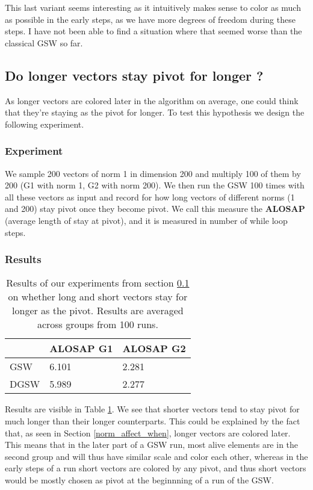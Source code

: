 \documentclass[12pt]{article}
\begin{document}
This last variant seems interesting as it intuitively makes sense to color as much as possible in the early steps, as we have more degrees of freedom during these steps. I have not been able to find a situation where that seemed worse than the classical GSW so far. 


\subsection{Do longer vectors stay pivot for longer ?}\label{longer_vec_pivot_longer}
As longer vectors are colored later in the algorithm on average, one could think that they're staying as the pivot for longer. To test this hypothesis we design the following experiment.
\subsubsection{Experiment}
We sample 200 vectors of norm 1 in dimension 200 and multiply 100 of them by 200 (G1 with norm 1, G2 with norm 200). We then run the GSW 100 times with all these vectors as input and record for how long vectors of different norms (1 and 200) stay pivot once they become pivot. We call this measure the \textbf{ALOSAP} (average length of stay at pivot), and it is measured in number of while loop steps.
\subsubsection{Results}
\begin{table}[h!]
\centering
\caption{Results of our experiments  from section \ref{longer_vec_pivot_longer} on whether long and short vectors stay for longer as the pivot. Results are averaged across groups from 100 runs.}
\begin{tabular}{l|ll}
 &ALOSAP G1&ALOSAP G2\\
\hline
GSW&6.101&2.281\\
DGSW&5.989&2.277
\end{tabular}
\label{pivot_longer}
\end{table}

Results are visible in Table \ref{pivot_longer}. We see that shorter vectors tend to stay pivot for much longer than their longer counterparts. This could be explained by the fact that, as seen in Section \ref{norm_affect_when}, longer vectors are colored later. This means that in the later part of a GSW run, most alive elements are in the second group and will thus have similar scale and color each other, whereas in the early steps of a run short vectors are colored by any pivot, and thus short vectors would be mostly chosen as pivot at the beginnning of a run of the GSW. %
\end{document}
